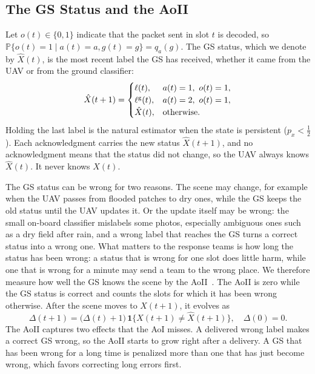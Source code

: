 \documentclass[journal]{IEEEtran}
\theoremstyle{remark}
\newcommand{\Prob}{\mathbb{P}}
\newcommand{\ind}[1]{\mathbf{1}\{#1\}}
\newcommand{\lab}{\ell}
\begin{document}
\subsection{The GS Status and the AoII}
Let $o(t)\in\{0,1\}$ indicate that the packet sent in slot $t$ is decoded, so $\Prob\{o(t)=1\mid a(t)=a,g(t)=g\}=q_a(g)$. The GS status, which we denote by $\hat X(t)$, is the most recent label the GS has received, whether it came from the UAV or from the ground classifier:
\begin{equation}\label{eq:est}
\hat X(t+1)=\begin{cases}\lab(t), & a(t)=1,\ o(t)=1,\\ \lab^{\rm g}(t), & a(t)=2,\ o(t)=1,\\ \hat X(t), & \text{otherwise.}\end{cases}
\end{equation}
Holding the last label is the natural estimator when the state is persistent ($p_x<\frac12$). Each acknowledgment carries the new status $\hat X(t+1)$, and no acknowledgment means that the status did not change, so the UAV always knows $\hat X(t)$. It never knows $X(t)$.

The GS status can be wrong for two reasons. The scene may change, for example when the UAV passes from flooded patches to dry ones, while the GS keeps the old status until the UAV updates it. Or the update itself may be wrong: the small on-board classifier mislabels some photos, especially ambiguous ones such as a dry field after rain, and a wrong label that reaches the GS turns a correct status into a wrong one. What matters to the response teams is how long the status has been wrong: a status that is wrong for one slot does little harm, while one that is wrong for a minute may send a team to the wrong place. We therefore measure how well the GS knows the scene by the AoII~\cite{maatouk2020aoii}. The AoII is zero while the GS status is correct and counts the slots for which it has been wrong otherwise. After the scene moves to $X(t+1)$, it evolves as
\begin{equation}\label{eq:aoii}
\Delta(t+1)=\big(\Delta(t)+1\big)\,\ind{X(t+1)\neq\hat X(t+1)},\quad \Delta(0)=0.
\end{equation}
The AoII captures two effects that the AoI misses. A delivered wrong label makes a correct GS wrong, so the AoII starts to grow right after a delivery. A GS that has been wrong for a long time is penalized more than one that has just become wrong, which favors correcting long errors first.
\end{document}

